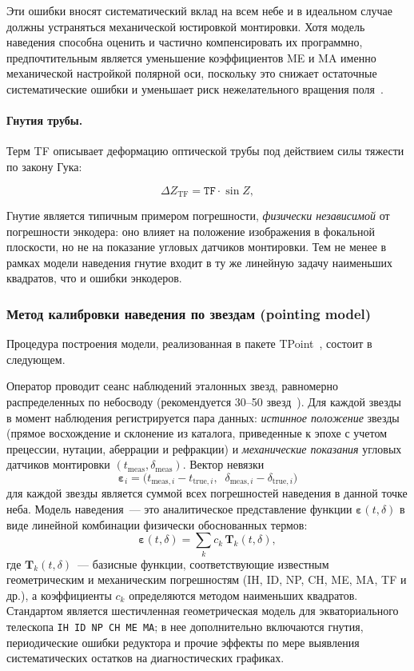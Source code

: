 Эти ошибки вносят систематический вклад на всем небе и в идеальном случае должны устраняться механической юстировкой монтировки. Хотя модель наведения способна оценить и частично компенсировать их программно, предпочтительным является уменьшение коэффициентов ME и MA именно механической настройкой полярной оси, поскольку это снижает остаточные систематические ошибки и уменьшает риск нежелательного вращения поля~\cite{TPoint_Wallace}.

\paragraph{Гнутия трубы.} Терм TF описывает деформацию оптической трубы под действием силы тяжести по закону Гука:
    
$$
\Delta Z_{\text{TF}} = \mathtt{TF} \cdot \sin Z,
$$

Гнутие является типичным примером погрешности, \textit{физически независимой} от погрешности энкодера: оно влияет на положение изображения в фокальной плоскости, но не на показание угловых датчиков монтировки. Тем не менее в рамках модели наведения гнутие входит в ту же линейную задачу наименьших квадратов, что и ошибки энкодеров.

\subsubsection{Метод калибровки наведения по звездам (pointing model)}
\label{subsubsec:pointing_method}

Процедура построения модели, реализованная в пакете TPoint~\cite{TPoint_Wallace}, состоит в следующем.

Оператор проводит сеанс наблюдений эталонных звезд, равномерно распределенных по небосводу (рекомендуется 30--50 звезд~\cite{TPoint_Wallace}). Для каждой звезды в момент наблюдения регистрируется пара данных: \textit{истинное положение} звезды (прямое восхождение и склонение из каталога, приведенные к эпохе с учетом прецессии, нутации, аберрации и рефракции) и \textit{механические показания} угловых датчиков монтировки $(t_{\text{meas}}, \delta_{\text{meas}})$. Вектор невязки
$$
\boldsymbol{\varepsilon}_i = \bigl(t_{\text{meas},i} - t_{\text{true},i},\;\;
\delta_{\text{meas},i} - \delta_{\text{true},i}\bigr)
$$
для каждой звезды является суммой всех погрешностей наведения в данной точке неба. Модель наведения~--- это аналитическое представление функции $\boldsymbol{\varepsilon}(t, \delta)$ в виде линейной комбинации физически обоснованных термов:
\[
\boldsymbol{\varepsilon}(t,\delta) = \sum_{k} c_k \, \mathbf{T}_k(t, \delta),
\]
где $\mathbf{T}_k(t, \delta)$~--- базисные функции, соответствующие известным геометрическим и механическим погрешностям (IH, ID, NP, CH, ME, MA, TF и др.), а коэффициенты $c_k$ определяются методом наименьших квадратов. Стандартом является шестичленная геометрическая модель для экваториального телескопа \texttt{IH ID NP CH ME MA}; в нее дополнительно включаются гнутия, периодические ошибки редуктора и прочие эффекты по мере выявления систематических остатков на диагностических графиках.

